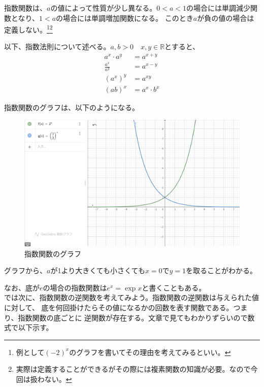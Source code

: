\documentclass[a4j,dvipdfmx]{jsarticle}
\begin{document}
                指数関数は、$a$の値によって性質が少し異なる。$0<a<1$の場合には単調減少関数となり、$1<a$の場合には単調増加関数になる。
                このとき$a$が負の値の場合は定義しない。\footnote{例として$(-2)^x$のグラフを書いてその理由を考えてみるといい。}\footnote{実際は定義することができるがその際には複素関数の知識が必要。なので今回は扱わない。}

                以下、指数法則について述べる。$a,b>0\quad x,y\in \mathbb{R}$とすると、
                \begin{align}
                    a^x\cdot a^y&=a^{x+y}\\
                    \frac{a^x}{a^y} &= a^{x-y}\\
                    (a^x)^y &= a^{xy}\\
                    (ab)^{x} &= a^x\cdot b^x
                \end{align}

                指数関数のグラフは、以下のようになる。
                \begin{figure}[h]
                    \centering
                    \includegraphics[keepaspectratio,scale=0.3]{img/QuuNote/ExpFuncGraph.png}
                    \caption{指数関数のグラフ}
                \end{figure}

                グラフから、$a$が1より大きくても小さくても$x=0$で$y=1$を取ることがわかる。

                なお、底が$e$の場合の指数関数は$e^x=\exp{x}$と書くこともある。\\

                では次に、指数関数の逆関数を考えてみよう。指数関数の逆関数は与えられた値に対して、
                底を何回掛けたらその値になるかの回数を表す関数である。つまり、指数関数の底ごとに
                逆関数が存在する。文章で見てもわかりずらいので数式で以下示す。
\end{document}
